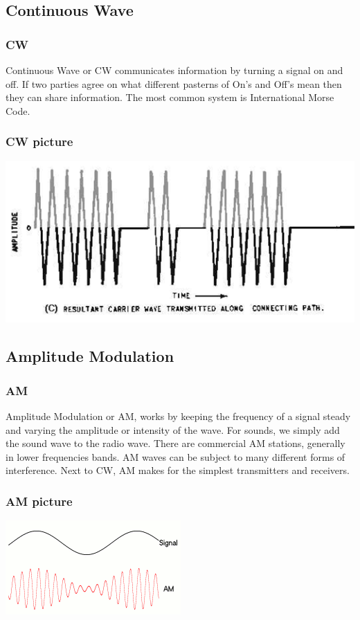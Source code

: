 \documentclass[10pt]{beamer}
\begin{document}
\subsection{Continuous Wave}
\begin{frame}
\frametitle{CW}
Continuous Wave or CW communicates information by turning a signal on and off. If two parties agree on what different pasterns of On's and Off's mean then they can share information. The most common system is International Morse Code. 
\end{frame}

\begin{frame}
\frametitle{CW picture}
\includegraphics[height=.5\textheight]{cw.png}
\end{frame}

\subsection{Amplitude Modulation}

\begin{frame}
\frametitle{AM}
Amplitude Modulation or AM, works by keeping the frequency of a signal steady and varying the amplitude or intensity of the wave. For sounds, we simply add the sound wave to the radio wave. There are commercial AM stations, generally in lower frequencies bands. AM waves can be subject to many different forms of interference. Next to CW, AM makes for the simplest transmitters and receivers.
\end{frame}

\begin{frame}
\frametitle{AM picture}
\includegraphics[height=.5\textheight]{am.png}
\end{frame}
\end{document}
